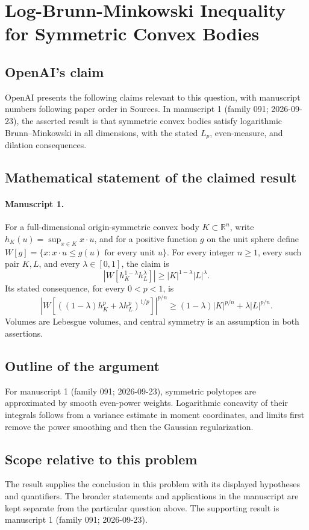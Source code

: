 \documentclass[11pt]{article}
\begin{document}
\section*{Log-Brunn-Minkowski Inequality for Symmetric Convex Bodies}

\subsection{OpenAI's claim}
OpenAI presents the following claims relevant to this question, with manuscript numbers following paper order in Sources. In manuscript 1 (family 091; 2026-09-23), the asserted result is that symmetric convex bodies satisfy logarithmic Brunn--Minkowski in all dimensions, with the stated $L_p$, even-measure, and dilation consequences.

\subsection{Mathematical statement of the claimed result}
\paragraph{Manuscript 1.}
For a full-dimensional origin-symmetric convex body $K\subset\mathbb R^n$, write $h_K(u)=\sup_{x\in K}x\cdot u$, and for a positive function $g$ on the unit sphere define $W[g]=\{x:x\cdot u\le g(u)\text{ for every unit }u\}$. For every integer $n\ge1$, every such pair $K,L$, and every $\lambda\in[0,1]$, the claim is
\[
 |W[h_K^{1-\lambda}h_L^{\lambda}]|\ge |K|^{1-\lambda}|L|^{\lambda}.
\]
Its stated consequence, for every $0<p<1$, is
\[
 \left|W[((1-\lambda)h_K^p+\lambda h_L^p)^{1/p}]\right|^{p/n}
 \ge(1-\lambda)|K|^{p/n}+\lambda|L|^{p/n}.
\]
Volumes are Lebesgue volumes, and central symmetry is an assumption in both assertions.

\subsection{Outline of the argument}
For manuscript 1 (family 091; 2026-09-23), symmetric polytopes are approximated by smooth even-power weights. Logarithmic concavity of their integrals follows from a variance estimate in moment coordinates, and limits first remove the power smoothing and then the Gaussian regularization.

\subsection{Scope relative to this problem}
The result supplies the conclusion in this problem with its displayed hypotheses and quantifiers. The broader statements and applications in the manuscript are kept separate from the particular question above. The supporting result is manuscript 1 (family 091; 2026-09-23).
\end{document}
